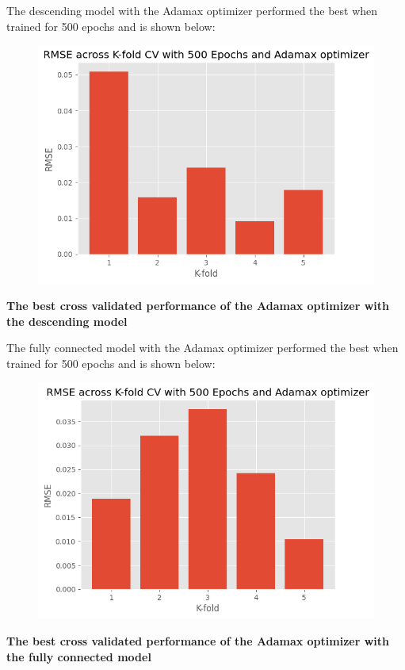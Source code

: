 \documentclass[12pt]{article}
\begin{document}
	The descending model with the Adamax optimizer performed the best when trained for 500 epochs and is shown below:

	\begin{figure}[H]
		\includegraphics[scale=0.400]{CV_descending_adamax.png}
		\centering
	\end{figure}
	\begin{center}
		\textbf{\scriptsize The best cross validated performance of the Adamax optimizer with the descending model}
	\end{center}


	The fully connected model with the Adamax optimizer performed the best when trained for 500 epochs and is shown below:

	\begin{figure}[H]
		\includegraphics[scale=0.400]{CV_fullconnected_adamax.png}
		\centering
	\end{figure}
	\begin{center}
		\textbf{\scriptsize The best cross validated performance of the Adamax optimizer with the fully connected model}
	\end{center}
\end{document}

